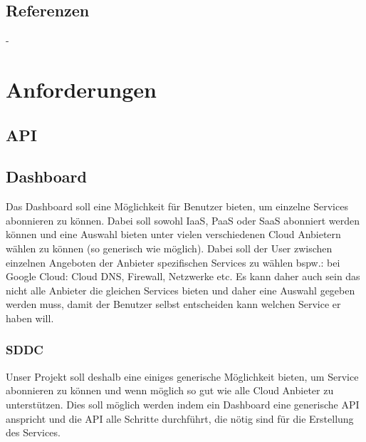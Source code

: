 \documentclass[11pt]{scrartcl}
\begin{document}
\subsection{Referenzen}
-

\section{Anforderungen}
\subsection{API}


\subsection{Dashboard}
Das Dashboard soll eine Möglichkeit für Benutzer bieten, um einzelne Services 
abonnieren zu können.
Dabei soll sowohl IaaS, PaaS oder SaaS abonniert werden können und eine Auswahl 
bieten unter vielen verschiedenen Cloud Anbietern wählen zu können (so generisch wie 
möglich).
Dabei soll der User zwischen einzelnen Angeboten der Anbieter spezifischen 
Services zu wählen bspw.: bei Google Cloud: Cloud DNS, Firewall, Netzwerke etc.
Es kann daher auch sein das nicht alle Anbieter die gleichen Services bieten und 
daher eine Auswahl gegeben werden muss, damit der Benutzer selbst entscheiden 
kann welchen Service er haben will.

\subsubsection{SDDC}
Unser Projekt soll deshalb eine einiges generische Möglichkeit bieten, um 
Service abonnieren zu können und wenn möglich so gut wie alle Cloud Anbieter zu 
unterstützen.
Dies soll möglich werden indem ein Dashboard eine generische API anspricht und 
die API alle Schritte durchführt, die nötig sind für die Erstellung des 
Services.
\end{document}
